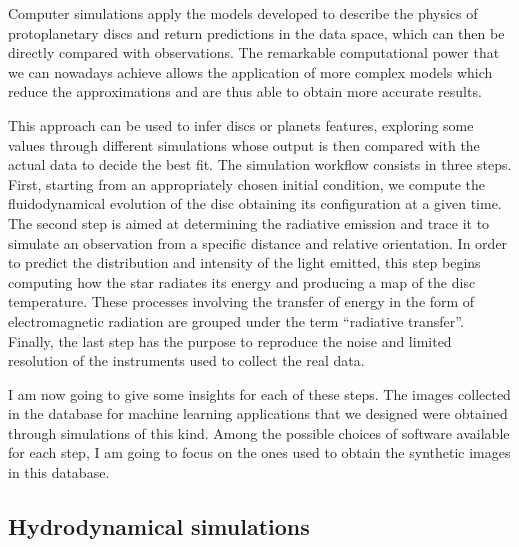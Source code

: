 \documentclass[a4paper,10pt]{report}
\begin{document}
Computer simulations apply the models developed to describe the physics of protoplanetary discs 
and return predictions in the data space, which can then be directly compared with observations.
The remarkable computational power that we can nowadays achieve allows the application of
more complex models which reduce the approximations and are thus able to obtain more 
accurate results.

This approach can be used to infer discs or planets features, exploring some values through different simulations
whose output is then compared with the actual data to decide the best fit.
The simulation workflow consists in three steps. 
First, starting from an appropriately chosen initial condition,
we compute the fluidodynamical evolution of the disc obtaining its configuration
at a given time. The second step is aimed at determining the radiative emission and trace it 
to simulate an observation from a specific distance and relative orientation.
In order to predict the distribution and intensity of the light emitted, this step begins computing
how the star radiates its energy and producing a map of the disc temperature. These processes involving the
transfer of energy in the form of electromagnetic radiation are grouped under the term ``radiative transfer''.
Finally, the last step has the purpose to reproduce the noise and limited resolution of the instruments 
used to collect the real data.

I am now going to give some insights for each of these steps. The images collected in the database for machine learning
applications that we designed were obtained through simulations of this kind. Among the possible choices
of software available for each step, I am going to focus on the ones used to obtain the synthetic images
in this database.

\subsection{Hydrodynamical simulations}

\end{document}
